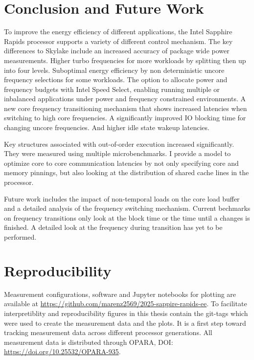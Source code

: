 \chapter{Conclusion and Future Work}
\label{sec:summary}

To improve the energy efficiency of different applications, the Intel Sapphire Rapids processor supports a variety of different control mechanism.
The key differences to Skylake include an increased accuracy of package wide power measurements.
Higher turbo frequencies for more workloads by splitting then up into four levels.
Suboptimal energy efficiency by non deterministic uncore frequency selections for some workloads.
The option to allocate power and frequency budgets with Intel Speed Select, enabling running multiple or inbalanced applications under power and frequency constrained environments.
A new core frequency transitioning mechanism that shows increased latencies when switching to high core frequencies.
A significantly improved IO blocking time for changing uncore frequencies.
And higher idle state wakeup latencies.

Key structures associated with out-of-order execution increased significantly.
They were measured using multiple microbenchmarks.
I provide a model to optimize core to core communication latencies by not only specifying core and memory pinnings, but also looking at the distribution of shared cache lines in the processor.

Future work includes the impact of non-temporal loads on the core load buffer and a detailed analysis of the frequency switching mechanism.
Current bechmarks on frequency transitions only look at the block time or the time until a changes is finished.
A detailed look at the frequency during transition has yet to be performed.

\chapter*{Reproducibility}
Measurement configurations, software and Jupyter notebooks for plotting are available at \url{https://github.com/marenz2569/2025-sappire-rapids-ee}.
To facilitate interpretiblity and reproducibility figures in this thesis contain the git-tags which were used to create the measurement data and the plots.
It is a first step toward tracking measurement data across different processor generations.
All measurement data is distributed through OPARA, DOI: \url{https://doi.org/10.25532/OPARA-935}.
